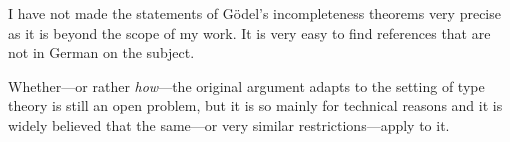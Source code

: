 I have not made the statements of Gödel's incompleteness theorems very precise
as it is beyond the scope of my work. It is very easy to find references that
are not in German on the subject.

Whether---or rather \emph{how}---the original argument adapts to the setting of
type theory is still an open problem, but it is so mainly for technical reasons
and it is widely believed that the same---or very similar restrictions---apply
to it.